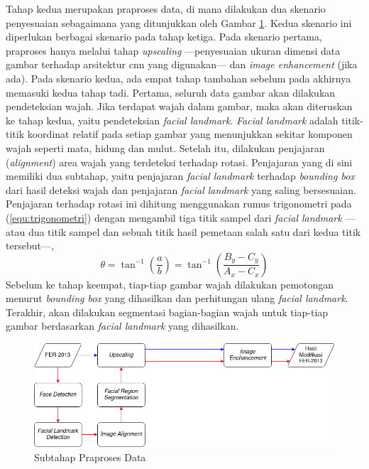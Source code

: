 Tahap kedua merupakan praproses data, di mana dilakukan dua skenario penyesuaian sebagaimana yang ditunjukkan oleh Gambar \ref{fig:praprosesdata}. Kedua skenario ini diperlukan berbagai skenario pada tahap ketiga. Pada skenario pertama, praproses hanya melalui tahap \textit{upscaling} ---penyesuaian ukuran dimensi data gambar terhadap arsitektur \acrshort{cnn} yang digunakan--- dan \textit{image enhancement} (jika ada). Pada skenario kedua, ada empat tahap tambahan sebelum pada akhirnya memasuki kedua tahap tadi. Pertama, seluruh data gambar akan dilakukan pendeteksian wajah. Jika terdapat wajah dalam gambar, maka akan diteruskan ke tahap kedua, yaitu pendeteksian \textit{facial landmark}. \textit{Facial landmark} adalah titik-titik koordinat relatif pada setiap gambar yang menunjukkan sekitar komponen wajah seperti mata, hidung dan mulut. Setelah itu, dilakukan penjajaran (\textit{alignment}) area wajah yang terdeteksi terhadap rotasi. Penjajaran yang di sini memiliki dua subtahap, yaitu penjajaran \textit{facial landmark} terhadap \textit{bounding box} dari hasil deteksi wajah dan penjajaran \textit{facial landmark} yang saling bersesuaian. Penjajaran terhadap rotasi ini dihitung menggunakan rumus trigonometri  pada (\ref{equ:trigonometri}) dengan mengambil tiga titik sampel dari \textit{facial landmark} ---atau dua titik sampel dan sebuah titik hasil pemetaan salah satu dari kedua titik tersebut---,
\begin{equation}
    \theta = \tan^{-1}{\left(\frac{a}{b}\right)} = \tan^{-1}{\left(\frac{B_y-C_y}{A_x-C_x}\right)}
    \label{equ:trigonometri}
\end{equation}
Sebelum ke tahap keempat, tiap-tiap gambar wajah dilakukan pemotongan menurut \textit{bounding box} yang dihasilkan dan perhitungan ulang \textit{facial landmark}. Terakhir, akan dilakukan segmentasi bagian-bagian wajah untuk tiap-tiap gambar berdasarkan \textit{facial landmark} yang dihasilkan.
\begin{figure}
    \centering
    \includegraphics[width=14cm]{gambar/praproses_data.png}
    \caption{Subtahap Praproses Data}
    \label{fig:praprosesdata}
\end{figure}

